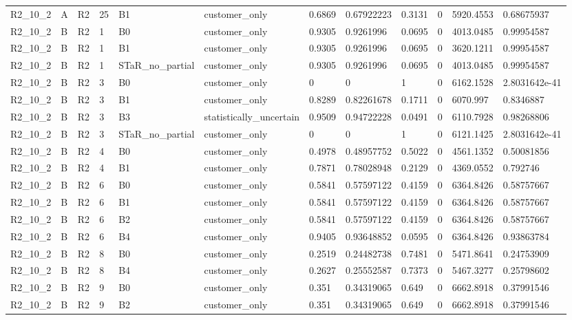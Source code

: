 \begin{longtable}{llllllllllll}
R2\_10\_2 & A & R2 & 25 & B1 & customer\_only & 0.6869 & 0.67922223 & 0.3131 & 0 & 5920.4553 & 0.68675937 \\
R2\_10\_2 & B & R2 & 1 & B0 & customer\_only & 0.9305 & 0.9261996 & 0.0695 & 0 & 4013.0485 & 0.99954587 \\
R2\_10\_2 & B & R2 & 1 & B1 & customer\_only & 0.9305 & 0.9261996 & 0.0695 & 0 & 3620.1211 & 0.99954587 \\
R2\_10\_2 & B & R2 & 1 & STaR\_no\_partial & customer\_only & 0.9305 & 0.9261996 & 0.0695 & 0 & 4013.0485 & 0.99954587 \\
R2\_10\_2 & B & R2 & 3 & B0 & customer\_only & 0 & 0 & 1 & 0 & 6162.1528 & 2.8031642e-41 \\
R2\_10\_2 & B & R2 & 3 & B1 & customer\_only & 0.8289 & 0.82261678 & 0.1711 & 0 & 6070.997 & 0.8346887 \\
R2\_10\_2 & B & R2 & 3 & B3 & statistically\_uncertain & 0.9509 & 0.94722228 & 0.0491 & 0 & 6110.7928 & 0.98268806 \\
R2\_10\_2 & B & R2 & 3 & STaR\_no\_partial & customer\_only & 0 & 0 & 1 & 0 & 6121.1425 & 2.8031642e-41 \\
R2\_10\_2 & B & R2 & 4 & B0 & customer\_only & 0.4978 & 0.48957752 & 0.5022 & 0 & 4561.1352 & 0.50081856 \\
R2\_10\_2 & B & R2 & 4 & B1 & customer\_only & 0.7871 & 0.78028948 & 0.2129 & 0 & 4369.0552 & 0.792746 \\
R2\_10\_2 & B & R2 & 6 & B0 & customer\_only & 0.5841 & 0.57597122 & 0.4159 & 0 & 6364.8426 & 0.58757667 \\
R2\_10\_2 & B & R2 & 6 & B1 & customer\_only & 0.5841 & 0.57597122 & 0.4159 & 0 & 6364.8426 & 0.58757667 \\
R2\_10\_2 & B & R2 & 6 & B2 & customer\_only & 0.5841 & 0.57597122 & 0.4159 & 0 & 6364.8426 & 0.58757667 \\
R2\_10\_2 & B & R2 & 6 & B4 & customer\_only & 0.9405 & 0.93648852 & 0.0595 & 0 & 6364.8426 & 0.93863784 \\
R2\_10\_2 & B & R2 & 8 & B0 & customer\_only & 0.2519 & 0.24482738 & 0.7481 & 0 & 5471.8641 & 0.24753909 \\
R2\_10\_2 & B & R2 & 8 & B4 & customer\_only & 0.2627 & 0.25552587 & 0.7373 & 0 & 5467.3277 & 0.25798602 \\
R2\_10\_2 & B & R2 & 9 & B0 & customer\_only & 0.351 & 0.34319065 & 0.649 & 0 & 6662.8918 & 0.37991546 \\
R2\_10\_2 & B & R2 & 9 & B2 & customer\_only & 0.351 & 0.34319065 & 0.649 & 0 & 6662.8918 & 0.37991546 \\

\end{longtable}

